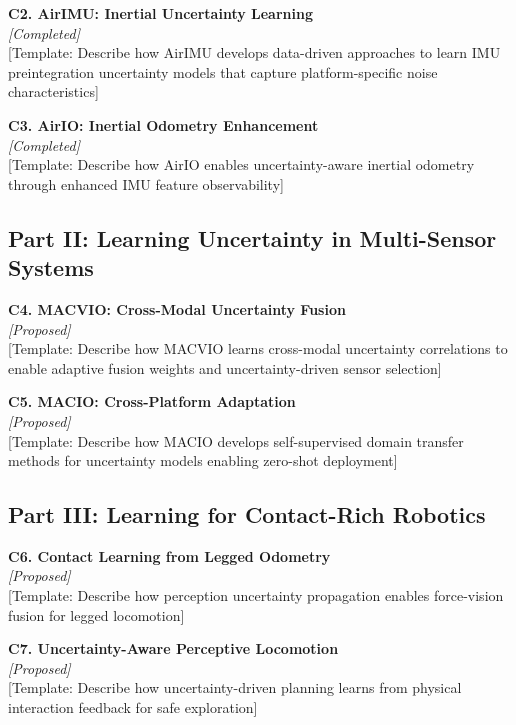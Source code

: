 \textbf{C2. AirIMU: Inertial Uncertainty Learning} \\
\textit{[Completed]} \\
[Template: Describe how AirIMU develops data-driven approaches to learn IMU preintegration uncertainty models that capture platform-specific noise characteristics]

\textbf{C3. AirIO: Inertial Odometry Enhancement} \\
\textit{[Completed]} \\
[Template: Describe how AirIO enables uncertainty-aware inertial odometry through enhanced IMU feature observability]

\subsection{Part II: Learning Uncertainty in Multi-Sensor Systems}

\textbf{C4. MACVIO: Cross-Modal Uncertainty Fusion} \\
\textit{[Proposed]} \\
[Template: Describe how MACVIO learns cross-modal uncertainty correlations to enable adaptive fusion weights and uncertainty-driven sensor selection]

\textbf{C5. MACIO: Cross-Platform Adaptation} \\
\textit{[Proposed]} \\
[Template: Describe how MACIO develops self-supervised domain transfer methods for uncertainty models enabling zero-shot deployment]

\subsection{Part III: Learning for Contact-Rich Robotics}

\textbf{C6. Contact Learning from Legged Odometry} \\
\textit{[Proposed]} \\
[Template: Describe how perception uncertainty propagation enables force-vision fusion for legged locomotion]

\textbf{C7. Uncertainty-Aware Perceptive Locomotion} \\
\textit{[Proposed]} \\
[Template: Describe how uncertainty-driven planning learns from physical interaction feedback for safe exploration]

